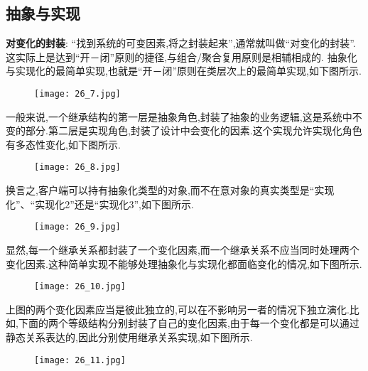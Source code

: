 \documentclass[../main.tex]{subfiles}
\begin{document}
\subsection{抽象与实现}
\textbf{对变化的封装}:
``找到系统的可变因素,将之封装起来'',通常就叫做``对变化的封装''.这实际上是达到``开－闭''原则的捷径,与组合/聚合复用原则是相辅相成的.
抽象化与实现化的最简单实现,也就是``开－闭''原则在类层次上的最简单实现,如下图所示.
%
\begin{figure}[H]
  \texttt{[image: 26\_7.jpg]}
\end{figure}
%
一般来说,一个继承结构的第一层是抽象角色,封装了抽象的业务逻辑,这是系统中不变的部分.第二层是实现角色,封装了设计中会变化的因素.这个实现允许实现化角色有多态性变化,如下图所示.
%
\begin{figure}[H]
  \texttt{[image: 26\_8.jpg]}
\end{figure}
%
换言之,客户端可以持有抽象化类型的对象,而不在意对象的真实类型是``实现化''、``实现化2''还是``实现化3'',如下图所示.
%
\begin{figure}[H]
  \texttt{[image: 26\_9.jpg]}
\end{figure}
%
显然,每一个继承关系都封装了一个变化因素,而一个继承关系不应当同时处理两个变化因素.这种简单实现不能够处理抽象化与实现化都面临变化的情况,如下图所示.
%
\begin{figure}[H]
  \texttt{[image: 26\_10.jpg]}
\end{figure}
%
上图的两个变化因素应当是彼此独立的,可以在不影响另一者的情况下独立演化.比如,下面的两个等级结构分别封装了自己的变化因素,由于每一个变化都是可以通过静态关系表达的,因此分别使用继承关系实现,如下图所示.
\begin{figure}[H]
  \texttt{[image: 26\_11.jpg]}
\end{figure}
%
\end{document}
